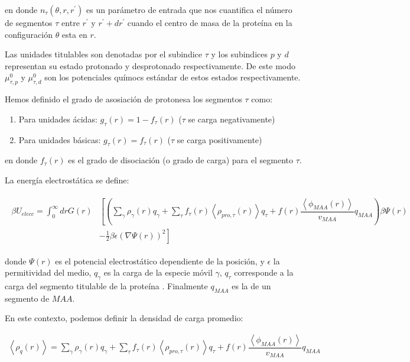 \noindent en donde $n_\tau(\theta,r,r^\prime)$  es un par\'ametro de entrada que nos cuantifica el n\'umero de segmentos $\tau$ entre $r^\prime$ y $r^\prime+ dr^\prime$ cuando el centro de masa de la prote\'ina en la configuraci\'on $\theta$ esta en $r$.

Las unidades titulables son denotadas por el subindice $\tau$  y los subindices $p$ y $d$ representan su estado protonado y desprotonado respectivamente. 
De este modo$\mu^0_{\tau,p}$ y $\mu^0_{\tau,d}$  son los potenciales qu\'imocs est\'andar de estos estados respectivamente.

Hemos definido el grado de asosiaci\'on de protonesa los segmentos $\tau$
como: 
 
\begin{enumerate}
	\item Para unidades \'acidas: $g_\tau(r) = 1-f_\tau(r)$ ($\tau$ se carga negativamente)
	\item Para unidades b\'asicas: $g_\tau(r) = f_\tau(r)$ ($\tau$ se carga positivamente)
\end{enumerate}
\noindent en donde $f_\tau(r)$  es el grado de disociaci\'on (o grado de carga) para el segmento $\tau$.

La energ\'ia electrost\'atica se define:

\begin{align}
	\begin{aligned}
		\beta U_{elecc}= \int_0^\infty drG(r)&\left[\left(\sum_{\gamma } {\rho_\gamma(r) q_\gamma + \sum_\tau{f_\tau(r) \left<\rho_{pro,\tau}(r)\right> q_\tau} +  f(r)\dfrac{\left<\phi_{MAA}(r)\right>}{v_{MAA}}q_{MAA}}\right)\beta\Psi(r) \right. \\ &\left.-\frac{1}{2}\beta\epsilon(\nabla\Psi(r))^2 \right]
	\end{aligned}
\end{align} 

\noindent donde $\Psi(r)$ es el potencial electrost\'atico dependiente de la posici\'on, y $\epsilon$ la permitividad del medio, $q_\gamma$ es la carga de la especie m\'ovil $\gamma$, $q_\tau$ corresponde a la carga del segmento titulable de la prote\'ina . Finalmente $q_{MAA}$ es la de un segmento de $MAA$.

En este contexto, podemos definir la densidad de carga promedio: 

\begin{align}
	\left<\rho_q(r)\right> = \sum_{\gamma } {\rho_\gamma(r) q_\gamma + \sum_\tau{f_\tau(r) \left<\rho_{pro,\tau}(r)\right> q_\tau} +  f(r)\dfrac{\left<\phi_{MAA}(r)\right>}{v_{MAA}}q_{MAA}}
	\label{eq:esf:rho-charge}
\end{align}  
             
